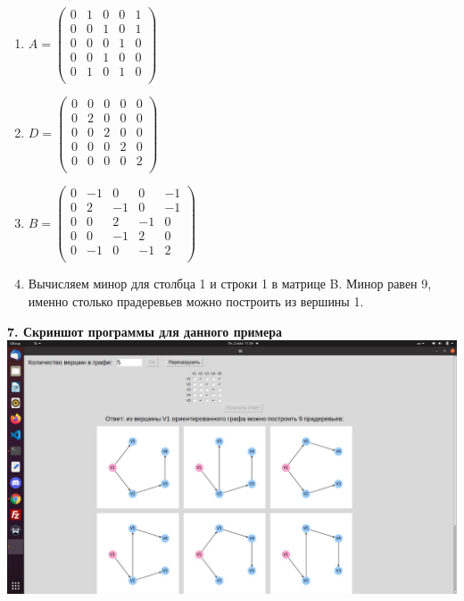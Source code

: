 \documentclass{article}
\begin{document}
\begin{flushleft}
\\
\begin{enumerate}
\item $A = 
\begin{pmatrix}
	0 & 1 & 0 & 0 & 1\\
	0 & 0 & 1 & 0 & 1\\
	0 & 0 & 0 & 1 & 0\\
    0 & 0 & 1 & 0 & 0\\
	0 & 1 & 0 & 1 & 0\\
\end{pmatrix}$
\item  $D = 
\begin{pmatrix}
	0 & 0 & 0 & 0 & 0\\
	0 & 2 & 0 & 0 & 0\\
	0 & 0 & 2 & 0 & 0\\
    0 & 0 & 0 & 2 & 0\\
	0 & 0 & 0 & 0 & 2\\
\end{pmatrix}$
\item $B = 
\begin{pmatrix}
	0 & -1 & 0 & 0 & -1\\
	0 & 2 & -1 & 0 & -1\\
	0 & 0 & 2 & -1 & 0\\
    0 & 0 & -1 & 2 & 0\\
	0 & -1 & 0 & -1 & 2\\
\end{pmatrix}$
\newpage
\item  Вычисляем минор для столбца 1 и строки 1 в матрице B. Минор равен 9, именно столько прадеревьев можно построить из вершины 1.
\end{enumerate}
\end{flushleft}
\textbf{7. Скриншот программы для данного примера} 
\vspace{5mm}
\\
\hspace*{5mm}
\includegraphics [scale=0.25]{ForDMreport.jpg}
\end{document}
